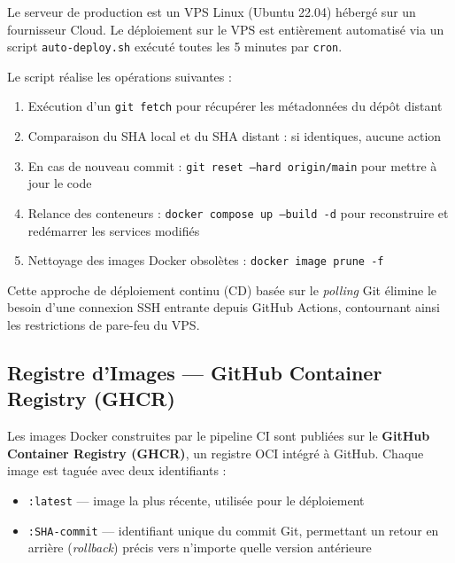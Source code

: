 Le serveur de production est un VPS Linux (Ubuntu 22.04) hébergé sur un fournisseur Cloud. Le déploiement sur le VPS est entièrement automatisé via un script \texttt{auto-deploy.sh} exécuté toutes les 5 minutes par \texttt{cron}.

\vspace{0.5em}

Le script réalise les opérations suivantes :

\begin{enumerate}
    \item Exécution d’un \texttt{git fetch} pour récupérer les métadonnées du dépôt distant
    \item Comparaison du SHA local et du SHA distant : si identiques, aucune action
    \item En cas de nouveau commit : \texttt{git reset --hard origin/main} pour mettre à jour le code
    \item Relance des conteneurs : \texttt{docker compose up --build -d} pour reconstruire et redémarrer les services modifiés
    \item Nettoyage des images Docker obsolètes : \texttt{docker image prune -f}
\end{enumerate}

\vspace{0.5em}

Cette approche de déploiement continu (CD) basée sur le \textit{polling} Git élimine le besoin d’une connexion SSH entrante depuis GitHub Actions, contournant ainsi les restrictions de pare-feu du VPS.

\subsection{Registre d’Images — GitHub Container Registry (GHCR)}

Les images Docker construites par le pipeline CI sont publiées sur le \textbf{GitHub Container Registry (GHCR)}, un registre OCI intégré à GitHub. Chaque image est taguée avec deux identifiants :

\begin{itemize}[label=--]
    \item \texttt{:latest} — image la plus récente, utilisée pour le déploiement
    \item \texttt{:SHA-commit} — identifiant unique du commit Git, permettant un retour en arrière (\textit{rollback}) précis vers n’importe quelle version antérieure
\end{itemize}

